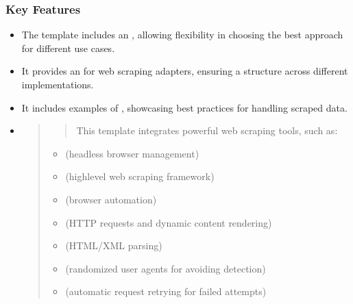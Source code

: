 \documentclass[letterpaper,10pt,english]{sphinxhowto}
\begin{document}
\subsubsection{Key Features}
\label{\detokenize{templates/web_scraping/index:key-features}}\begin{itemize}
\item {} 
\sphinxAtStartPar
{} The template includes an , allowing flexibility in choosing the best approach for different use cases.

\item {} 
\sphinxAtStartPar
{} It provides an  for web scraping adapters, ensuring a  structure across different implementations.

\item {} 
\sphinxAtStartPar
{} It includes examples of , showcasing best practices for handling scraped data.

\item {} 
\sphinxAtStartPar
{}
\begin{quote}
\begin{quote}

\sphinxAtStartPar
This template integrates powerful web scraping tools, such as:
\end{quote}
\begin{itemize}
\item {} 
\sphinxAtStartPar
{} (headless browser management)

\item {} 
\sphinxAtStartPar
{} (high\sphinxhyphen{}level web scraping framework)

\item {} 
\sphinxAtStartPar
{} (browser automation)

\item {} 
\sphinxAtStartPar
{} (HTTP requests and dynamic content rendering)

\item {} 
\sphinxAtStartPar
{} (HTML/XML parsing)

\item {} 
\sphinxAtStartPar
{} (randomized user agents for avoiding detection)

\item {} 
\sphinxAtStartPar
{} (automatic request retrying for failed attempts)

\end{itemize}
\end{quote}

\end{itemize}
\end{document}
